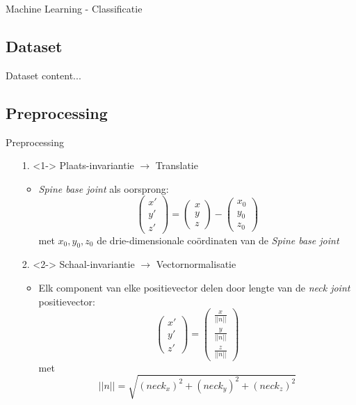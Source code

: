 \documentclass[]{beamer}
\begin{document}
	\begin{frame}{Machine Learning - Classificatie}
		
	\end{frame}
	\subsection{Dataset}
	\begin{frame}{Dataset}
		content...
	\end{frame}
	\subsection{Preprocessing}
	\begin{frame}{Preprocessing}
		\begin{enumerate}
			\item[1.]<1-> Plaats-invariantie $\rightarrow$ Translatie
			\begin{itemize}
				\item \textit{Spine base joint} als oorsprong:
				$$\begin{pmatrix}
				x' \\
				y' \\
				z'
				\end{pmatrix}
				= \begin{pmatrix}
				x \\ y \\ z
				\end{pmatrix}
				- \begin{pmatrix}
				x_0 \\ y_0 \\ z_0
				\end{pmatrix}$$
				met $x_0, y_0, z_0$ de drie-dimensionale coördinaten van de \textit{Spine base joint}
			\end{itemize}
			\item[2.]<2-> Schaal-invariantie $\rightarrow$ Vectornormalisatie 
			\begin{itemize}
				\item Elk component van elke positievector delen door lengte van de \textit{neck joint} positievector:
				$$
				\begin{pmatrix}
				x' \\ y' \\ z'
				\end{pmatrix}
				=				
				\begin{pmatrix}
				\frac{x}{||n||} \\ \frac{y}{||n||}  \\ \frac{z}{||n||} 
				\end{pmatrix}
				$$
				met $$||n|| = \sqrt{(neck_x)^2 + (neck_y)^2 + (neck_z)^2}$$
			\end{itemize}
		\end{enumerate}
	\end{frame}
\end{document}
